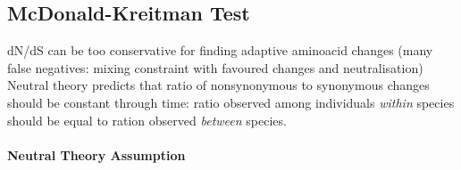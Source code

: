 \documentclass{scrartcl}
\begin{document}
\subsection{McDonald-Kreitman Test}
\label{sec:08-07}
dN/dS can be too conservative for finding adaptive aminoacid changes (many false negatives: mixing constraint with favoured changes and neutralisation)\\
Neutral theory predicts that ratio of nonsynonymous to synonymous changes should be constant through time: ratio observed among individuals {\em within} species should be equal to ration observed {\em between} species.

\paragraph{Neutral Theory Assumption}
\end{document}

